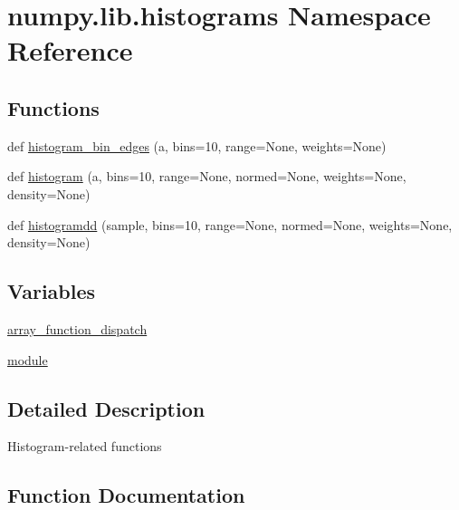 \hypertarget{namespacenumpy_1_1lib_1_1histograms}{}\section{numpy.\+lib.\+histograms Namespace Reference}
\label{namespacenumpy_1_1lib_1_1histograms}
\subsection*{Functions}
\begin{DoxyCompactItemize}
\item 
def \hyperlink{namespacenumpy_1_1lib_1_1histograms_ad32f0380d0c7e28fcc2c8a8ad9667a20}{histogram\+\_\+bin\+\_\+edges} (a, bins=10, range=None, weights=None)
\item 
def \hyperlink{namespacenumpy_1_1lib_1_1histograms_a74a327835a7c196592661a6cecd56194}{histogram} (a, bins=10, range=None, normed=None, weights=None, density=None)
\item 
def \hyperlink{namespacenumpy_1_1lib_1_1histograms_a387ca3b1d269072c6d588753fe308c2c}{histogramdd} (sample, bins=10, range=None, normed=None, weights=None, density=None)
\end{DoxyCompactItemize}
\subsection*{Variables}
\begin{DoxyCompactItemize}
\item 
\hyperlink{namespacenumpy_1_1lib_1_1histograms_a773227587f144e5334133beb38236128}{array\+\_\+function\+\_\+dispatch}
\item 
\hyperlink{namespacenumpy_1_1lib_1_1histograms_ad862dd3fd13f132e4b1c04d0ed396773}{module}
\end{DoxyCompactItemize}


\subsection{Detailed Description}
\begin{DoxyVerb}Histogram-related functions
\end{DoxyVerb}
 

\subsection{Function Documentation}
\mbox{\label{namespacenumpy_1_1lib_1_1histograms_a74a327835a7c196592661a6cecd56194}} 
